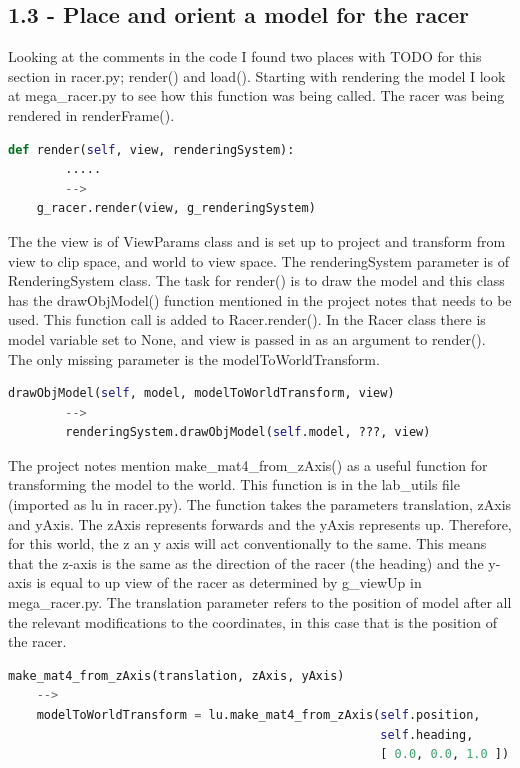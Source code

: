 \documentclass[a4 paper, 12pt]{article}
\begin{document}
\subsection{1.3 - Place and orient a model for the racer}
Looking at the comments in the code I found two places with TODO for this section in racer.py; render() and load(). Starting with rendering the model I look at mega\_racer.py to see how this function was being called. The racer was being rendered in renderFrame().
    \begin{lstlisting}[language=python]    
    def render(self, view, renderingSystem):
        .....
        -->
    g_racer.render(view, g_renderingSystem)        
    \end{lstlisting}  

The the view is of ViewParams class and is set up to project and transform from view to clip space, and world to view space. The renderingSystem parameter is of RenderingSystem class. The task for render() is to draw the model and this class has the drawObjModel() function mentioned in the project notes that needs to be used. This function call is added to Racer.render(). In the Racer class there is model variable set to None, and view is passed in as an argument to render(). The only missing parameter is the modelToWorldTransform.
    \begin{lstlisting}[language=python]   
        drawObjModel(self, model, modelToWorldTransform, view)
        -->
        renderingSystem.drawObjModel(self.model, ???, view)
    \end{lstlisting}  

The project notes mention make\_mat4\_from\_zAxis() as a useful function for transforming the model to the world. This function is in the lab\_utils file (imported as lu in racer.py). The function takes the parameters translation, zAxis and yAxis. The zAxis represents forwards and the yAxis represents up. Therefore, for this world, the z an y axis will act conventionally to the same. This means that the z-axis is the same as the direction of the racer (the heading) and the y-axis is equal to up view of the racer as determined by g\_viewUp in mega\_racer.py. The translation parameter refers to the position of model after all the relevant modifications to the coordinates, in this case that is the position of the racer.
    \begin{lstlisting}[language=python]   
    make_mat4_from_zAxis(translation, zAxis, yAxis)
    -->
    modelToWorldTransform = lu.make_mat4_from_zAxis(self.position, 
                                                    self.heading, 
                                                    [ 0.0, 0.0, 1.0 ])
    \end{lstlisting}
\end{document}
